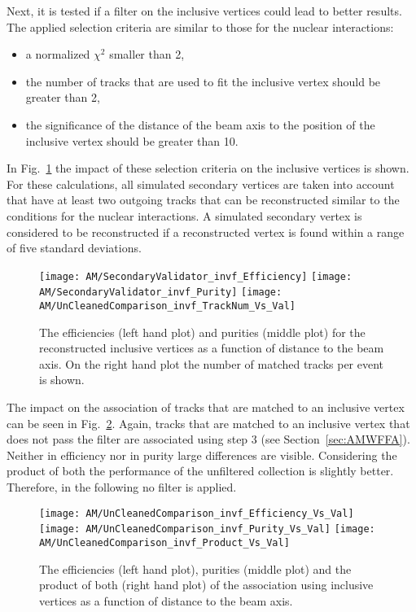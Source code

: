 Next, it is tested if a filter on the inclusive vertices could lead to better results. The applied selection criteria are similar to those for the nuclear interactions:
\begin{itemize}
    \item a normalized $\chi^{2}$ smaller than 2,
    \item the number of tracks that are used to fit the inclusive vertex should be greater than 2,
    \item the significance of the distance of the beam axis to the position of the inclusive vertex should be greater than 10.
\end{itemize}

In Fig.~\ref{plot:AMWFSVinvfEffAndPurDC} the impact of these selection criteria on the inclusive vertices is shown. For these calculations, all simulated secondary vertices are taken into account that have at least two outgoing tracks that can be reconstructed similar to the conditions for the nuclear interactions. A simulated secondary vertex is considered to be reconstructed if a reconstructed vertex is found within a range of five standard deviations.

\begin{figure}[!ht]
    \centering
    \texttt{[image: AM/SecondaryValidator\_invf\_Efficiency]}
    \texttt{[image: AM/SecondaryValidator\_invf\_Purity]}
    \texttt{[image: AM/UnCleanedComparison\_invf\_TrackNum\_Vs\_Val]}
    \caption[Purity and efficiency of the reconstructed inclusive vertices as a function of distance to the beam axis and number of matched tracks]{The efficiencies (left hand plot) and purities (middle plot) for the reconstructed inclusive vertices as a function of distance to the beam axis. On the right hand plot the number of matched tracks per event is shown. \label{plot:AMWFSVinvfEffAndPurDC}}
\end{figure}

The impact on the association of tracks that are matched to an inclusive vertex can be seen in Fig.~\ref{plot:AMWFSVinvfEffAndPurRT}.  Again, tracks that are matched to an inclusive vertex that does not pass the filter are associated using step 3 (see Section~\ref{sec:AMWFFA}). Neither in efficiency nor in purity large differences are visible. Considering the product of both the performance of the unfiltered collection is slightly better. Therefore, in the following no filter is applied.

\begin{figure}[!ht]
    \centering
    \texttt{[image: AM/UnCleanedComparison\_invf\_Efficiency\_Vs\_Val]}
    \texttt{[image: AM/UnCleanedComparison\_invf\_Purity\_Vs\_Val]}
    \texttt{[image: AM/UnCleanedComparison\_invf\_Product\_Vs\_Val]}
    \caption[Efficiencies, purities and their product of the association using different inclusive vertex collection as a function of distance to the beam axis]{The efficiencies (left hand plot), purities (middle plot) and the product of both (right hand plot) of the association using inclusive vertices as a function of distance to the beam axis. \label{plot:AMWFSVinvfEffAndPurRT}}
\end{figure}

